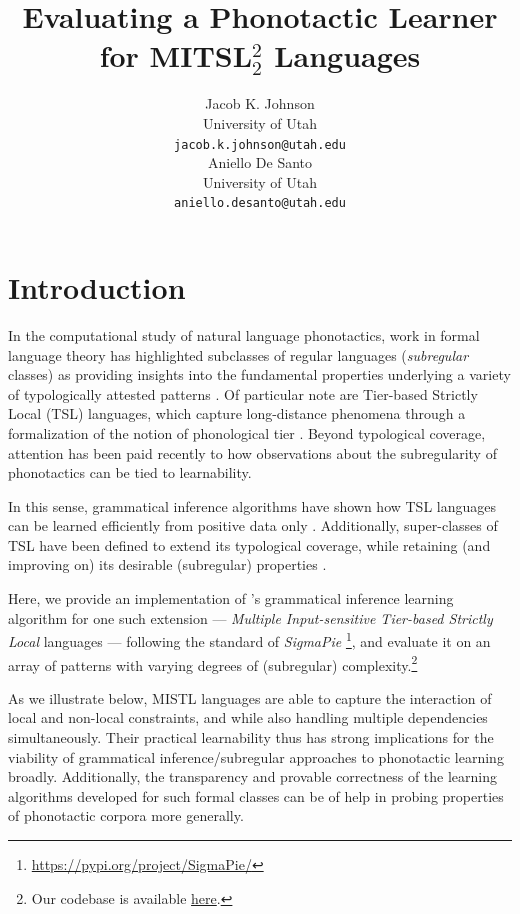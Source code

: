 \documentclass[11pt]{article}
\title{Evaluating a Phonotactic Learner for MITSL$^2_2$ Languages}
\author{Jacob K. Johnson \\
  University of Utah\\
  \small\texttt{jacob.k.johnson@utah.edu}\\
  \And 
  Aniello De Santo \\
  University of Utah\\
  \small\texttt{aniello.desanto@utah.edu}}
\begin{document}
\maketitle

\section{Introduction}
In the computational study of natural language phonotactics, work in formal language theory has highlighted subclasses of regular languages (\emph{subregular} classes) as providing insights into the fundamental properties underlying a variety of typologically attested patterns \citep{McNaughtonPapert71,chandlee2017computational}.\@
    Of particular note are Tier-based Strictly Local (TSL) languages, which capture long-distance phenomena through a formalization of the notion of phonological tier \citep{heinz2011tier}.\@ 
    Beyond typological coverage, attention has been paid recently to how observations about the subregularity of phonotactics can be tied to learnability.
    
    In this sense, grammatical inference algorithms have shown how TSL languages can be learned efficiently from positive data only \citep{jardine2016learning,jardinemcmullin17}.\@
    Additionally, super-classes of TSL have been defined to extend its typological coverage, while retaining (and improving on) its desirable (subregular) properties \citep[a.o.]{GrafMayer18}.
    
    Here, we provide an implementation of  \citet{de2021learning}'s grammatical inference learning algorithm for one such extension --- \emph{Multiple Input-sensitive Tier-based Strictly Local} languages \citep[MITSL;][]{de2019structure} --- following the standard of \emph{SigmaPie}  \citep{aksenova2020tool}\footnote{\href{https://pypi.org/project/SigmaPie/}{https://pypi.org/project/SigmaPie/}}, and evaluate it on an array of patterns with varying degrees of (subregular) complexity.\footnote{Our codebase is available \href{https://osf.io/w9prd/?view_only=d77df5dea63841fb8f749357f29df9e1}{here}.}
    
    As we illustrate below, MISTL languages are able to capture the interaction of local and non-local constraints, and while also handling multiple dependencies simultaneously.
    Their practical learnability thus has strong implications for the viability of grammatical inference/subregular approaches to phonotactic learning broadly.
    Additionally, the transparency and provable correctness of the learning algorithms developed for such formal classes can be of help in probing properties of phonotactic corpora more generally.
    
\end{document}

